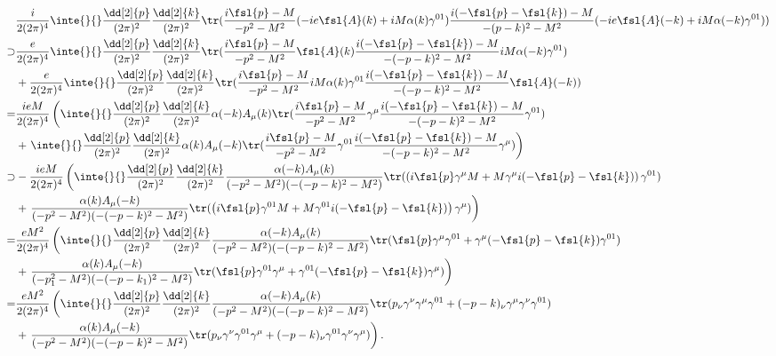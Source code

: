 \begin{align*}
	&\frac{i}{2(2\pi)^{4}}\inte{}{}\frac{\dd[2]{p}}{(2\pi)^{2}}\frac{\dd[2]{k}}{(2\pi)^{2}}\tr(\frac{i\fsl{p} - M}{-p^{2} - M^{2}}(-ie\fsl{A}(k) + iM\alpha(k)\gamma^{01})\frac{i(-\fsl{p} - \fsl{k}) - M}{-(p - k)^{2} - M^{2}}(-ie\fsl{A}(-k) + iM\alpha(-k)\gamma^{01})) \\
	\supset& \frac{e}{2(2\pi)^{4}}\inte{}{}\frac{\dd[2]{p}}{(2\pi)^{2}}\frac{\dd[2]{k}}{(2\pi)^{2}}\tr(\frac{i\fsl{p} - M}{-p^{2} - M^{2}}\fsl{A}(k)\frac{i(-\fsl{p} - \fsl{k}) - M}{-(-p - k)^{2} - M^{2}}iM\alpha(-k)\gamma^{01}) \\
	&+ \frac{e}{2(2\pi)^{4}}\inte{}{}\frac{\dd[2]{p}}{(2\pi)^{2}}\frac{\dd[2]{k}}{(2\pi)^{2}}\tr(\frac{i\fsl{p} - M}{-p^{2} - M^{2}}iM\alpha(k)\gamma^{01}\frac{i(-\fsl{p} - \fsl{k}) - M}{-(-p - k)^{2} - M^{2}}\fsl{A}(-k)) \\
	=& \frac{ieM}{2(2\pi)^{4}}\left(\inte{}{}\frac{\dd[2]{p}}{(2\pi)^{2}}\frac{\dd[2]{k}}{(2\pi)^{2}}\alpha(-k)A_{\mu}(k)\tr(\frac{i\fsl{p} - M}{-p^{2} - M^{2}}\gamma^{\mu}\frac{i(-\fsl{p} - \fsl{k}) - M}{-(-p - k)^{2} - M^{2}}\gamma^{01}) \right. \\
	 &+ \left. \inte{}{}\frac{\dd[2]{p}}{(2\pi)^{2}}\frac{\dd[2]{k}}{(2\pi)^{2}}\alpha(k)A_{\mu}(-k)\tr(\frac{i\fsl{p} - M}{-p^{2} - M^{2}}\gamma^{01}\frac{i(-\fsl{p} - \fsl{k}) - M}{-(-p - k)^{2} - M^{2}}\gamma^{\mu})\right) \\
	\supset& -\frac{ieM}{2(2\pi)^{4}}\left(\inte{}{}\frac{\dd[2]{p}}{(2\pi)^{2}}\frac{\dd[2]{k}}{(2\pi)^{2}}\frac{\alpha(-k)A_{\mu}(k)}{(-p^{2} - M^{2})(-(-p - k)^{2} - M^{2})}\tr(\left(i\fsl{p}\gamma^{\mu}M + M\gamma^{\mu}i(-\fsl{p} - \fsl{k})\right)\gamma^{01}) \right. \\
	 &+ \left. \frac{\alpha(k)A_{\mu}(-k)}{(-p^{2} - M^{2})(-(-p - k)^{2} - M^{2})}\tr(\left(i\fsl{p}\gamma^{01}M + M\gamma^{01}i(-\fsl{p} - \fsl{k})\right)\gamma^{\mu})\right) \\
	=& \frac{eM^{2}}{2(2\pi)^{4}}\left(\inte{}{}\frac{\dd[2]{p}}{(2\pi)^{2}}\frac{\dd[2]{k}}{(2\pi)^{2}}\frac{\alpha(-k)A_{\mu}(k)}{(-p^{2} - M^{2})(-(-p - k)^{2} - M^{2})}\tr(\fsl{p}\gamma^{\mu}\gamma^{01} + \gamma^{\mu}(-\fsl{p} - \fsl{k})\gamma^{01}) \right. \\
	 &+ \left. \frac{\alpha(k)A_{\mu}(-k)}{(-p_{1}^{2} - M^{2})(-(-p - k_{1})^{2} - M^{2})}\tr(\fsl{p}\gamma^{01}\gamma^{\mu} + \gamma^{01}(-\fsl{p} - \fsl{k})\gamma^{\mu})\right) \\
	=& \frac{eM^{2}}{2(2\pi)^{4}}\left(\inte{}{}\frac{\dd[2]{p}}{(2\pi)^{2}}\frac{\dd[2]{k}}{(2\pi)^{2}}\frac{\alpha(-k)A_{\mu}(k)}{(-p^{2} - M^{2})(-(-p - k)^{2} - M^{2})}\tr(p_{\nu}\gamma^{\nu}\gamma^{\mu}\gamma^{01} + (-p - k)_{\nu}\gamma^{\mu}\gamma^{\nu}\gamma^{01}) \right. \\
	 &+ \left. \frac{\alpha(k)A_{\mu}(-k)}{(-p^{2} - M^{2})(-(-p - k)^{2} - M^{2})}\tr(p_{\nu}\gamma^{\nu}\gamma^{01}\gamma^{\mu} + (-p - k)_{\nu}\gamma^{01}\gamma^{\nu}\gamma^{\mu})\right).
\end{align*}

